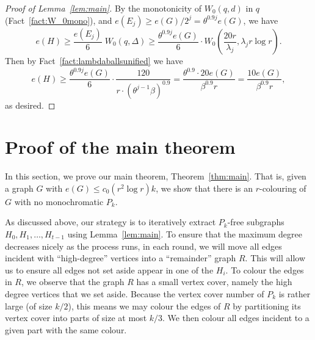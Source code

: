 \documentclass[12pt,reqno]{amsart}
\theoremstyle{remark}
\numberwithin{theorem}{section}
\renewcommand{\(}{\bigl(}
\renewcommand{\)}{\bigr)\vphantom{)}}
\renewcommand{\leq}{\le}
\renewcommand{\geq}{\ge}
\renewcommand{\le}{\leqslant}
\renewcommand{\ge}{\geqslant}
\begin{document}
\begin{proof}[Proof of Lemma~\ref{lem:main}]
    By the monotonicity of $W_0(q,d)$ in $q$ (Fact~\ref{fact:W_0mono}), and $e(E_j)\geq e(G)/2^j=\theta^{0.9j}e(G)$, we have
     \[e(H)\geq \frac{e(E_j)}{6} \;W_0(q,\Delta) \geq \frac{\theta^{0.9j}e(G)}{6} \cdot W_0\left(\frac{20r}{\lambda_j},\lambda_jr\log r\right).\]
     Then by Fact~\ref{fact:lambdaballsunified} we have
   \[e(H) \geq \frac{\theta^{0.9j}e(G)}{6} \cdot \frac{120}{r\cdot (\theta^{j-1}\beta)^{0.9}}=\dfrac{\theta^{0.9}\cdot 20  e(G)}{\beta^{0.9} r}= \dfrac{10 e(G)}{\beta^{0.9} r}, \]
   as desired.
   \end{proof}

\section{Proof of the main theorem}\label{sec:main-pf}

In this section, we prove our main theorem, Theorem~\ref{thm:main}. That is, given a graph $G$ with
$e(G)\leq c_0(r^2\log r)k$, we show that there is an $r$-colouring of $G$ with no
monochromatic $P_k$.

As discussed above, our strategy is to iteratively extract $P_k$-free subgraphs $H_0,H_1,\dots,H_{t-1}$ using
Lemma~\ref{lem:main}. To ensure that the maximum degree decreases nicely as the process runs, in each round, we will move all edges incident with ``high-degree'' vertices into a ``remainder'' graph $R$. This will allow us to ensure all edges not set aside appear in one of the $H_i$. To colour the edges in $R$, we observe that the graph $R$ has a small vertex cover, namely the high degree vertices that we set aside. Because the vertex cover number of $P_k$ is rather large (of size $k/2$), this means we may colour the edges of $R$ by partitioning its vertex cover into parts of size at most $k/3$. We then colour all edges incident to a given part with the same colour. 
\end{document}
